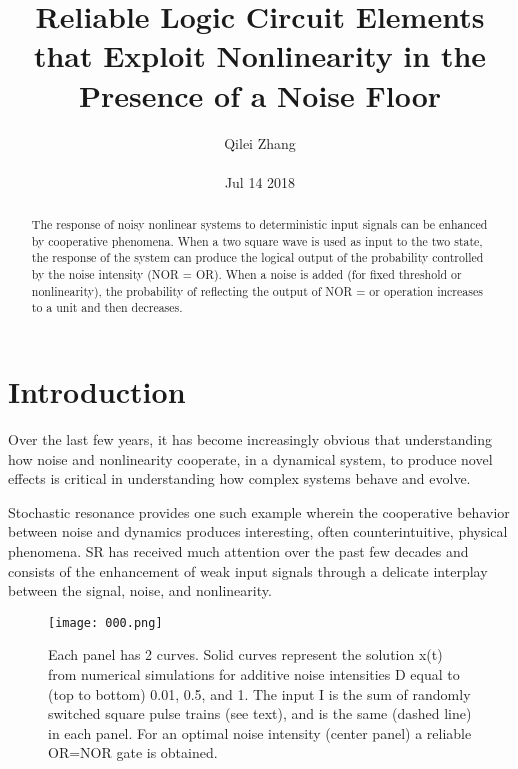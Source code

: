 \documentclass[30pt,twocolumn,letterpaper]{article}
\author{Qilei Zhang\\\\
Jul 14 2018}
\title{Reliable Logic Circuit Elements that Exploit Nonlinearity in the Presence of a Noise Floor}
\begin{document}
\maketitle
\begin{abstract}
  The response of noisy nonlinear systems to deterministic input signals can be enhanced by cooperative phenomena. When a two square wave is used as input to the two state, the response of the system can produce the logical output of the probability controlled by the noise intensity (NOR = OR). When a noise is added (for fixed threshold or nonlinearity), the probability of reflecting the output of NOR = or operation increases to a unit and then decreases.
\end{abstract}
\section{Introduction}
Over the last few years, it has become increasingly obvious that understanding how noise and nonlinearity cooperate, in a dynamical system, to produce novel effects is critical in understanding how complex systems behave and evolve\cite{Choudhury1977Reliability}. \\

\par
Stochastic resonance provides one such example wherein the cooperative behavior between noise and dynamics produces interesting, often counterintuitive, physical phenomena. SR has received much attention over the past few decades and consists of the enhancement of weak input signals through a delicate interplay between the signal, noise, and nonlinearity\cite{Dokouzgiannis1987A}.
\begin{figure}[htbp]
\small
\centering
\texttt{[image: 000.png]}
\caption{Each panel has
2 curves. Solid curves represent the solution x(t) from numerical
simulations for additive noise intensities D equal to (top to
bottom) 0.01, 0.5, and 1. The input I is the sum of randomly
switched square pulse trains (see text), and is the same (dashed
line) in each panel. For an optimal noise intensity (center panel)
a reliable OR=NOR gate is obtained.
}
\label{fig:lable}
\end{figure}\\
\end{document}
